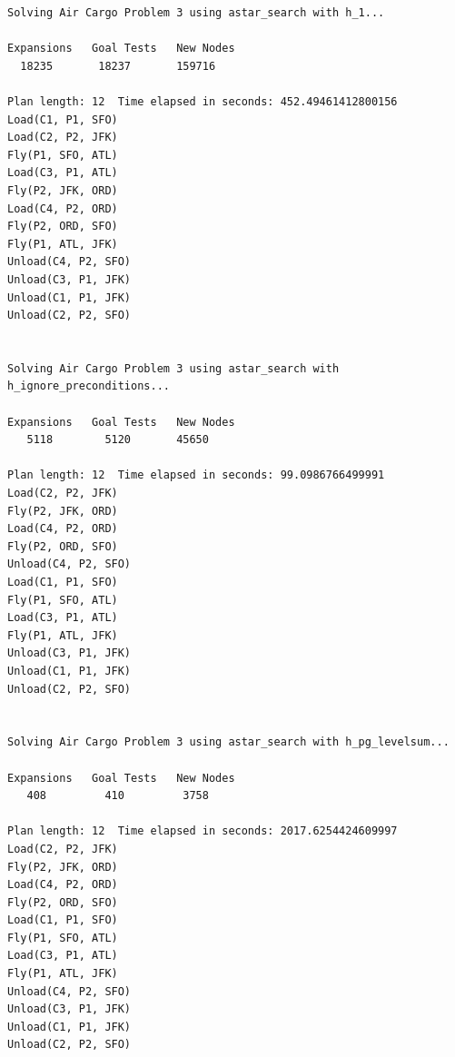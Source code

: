 \documentclass[10pt, a4paper,english]{article}
\begin{document}
\begin{lstlisting}
Solving Air Cargo Problem 3 using astar_search with h_1...

Expansions   Goal Tests   New Nodes
  18235       18237       159716  

Plan length: 12  Time elapsed in seconds: 452.49461412800156
Load(C1, P1, SFO)
Load(C2, P2, JFK)
Fly(P1, SFO, ATL)
Load(C3, P1, ATL)
Fly(P2, JFK, ORD)
Load(C4, P2, ORD)
Fly(P2, ORD, SFO)
Fly(P1, ATL, JFK)
Unload(C4, P2, SFO)
Unload(C3, P1, JFK)
Unload(C1, P1, JFK)
Unload(C2, P2, SFO)


Solving Air Cargo Problem 3 using astar_search with h_ignore_preconditions...

Expansions   Goal Tests   New Nodes
   5118        5120       45650   

Plan length: 12  Time elapsed in seconds: 99.0986766499991
Load(C2, P2, JFK)
Fly(P2, JFK, ORD)
Load(C4, P2, ORD)
Fly(P2, ORD, SFO)
Unload(C4, P2, SFO)
Load(C1, P1, SFO)
Fly(P1, SFO, ATL)
Load(C3, P1, ATL)
Fly(P1, ATL, JFK)
Unload(C3, P1, JFK)
Unload(C1, P1, JFK)
Unload(C2, P2, SFO)


Solving Air Cargo Problem 3 using astar_search with h_pg_levelsum...

Expansions   Goal Tests   New Nodes
   408         410         3758   

Plan length: 12  Time elapsed in seconds: 2017.6254424609997
Load(C2, P2, JFK)
Fly(P2, JFK, ORD)
Load(C4, P2, ORD)
Fly(P2, ORD, SFO)
Load(C1, P1, SFO)
Fly(P1, SFO, ATL)
Load(C3, P1, ATL)
Fly(P1, ATL, JFK)
Unload(C4, P2, SFO)
Unload(C3, P1, JFK)
Unload(C1, P1, JFK)
Unload(C2, P2, SFO)

\end{lstlisting}
\end{document}
